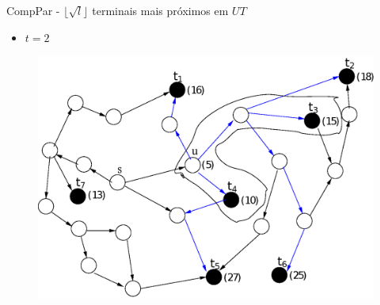 \documentclass[10pt]{beamer}
\begin{document}
\begin{frame}{CompPar - $\lfloor \sqrt{l} \rfloor$ terminais mais próximos em $UT$}
\begin{itemize}
  \item $t = 2$
\end{itemize}
\begin{figure}[H]
\centering
\includegraphics[scale=0.45]{imagens/compPar_tree1}
\label{fig:fig}
\end{figure}
\end{frame}
\end{document}
